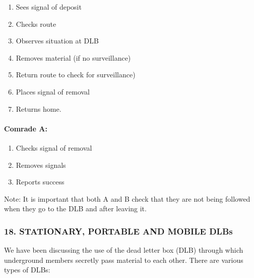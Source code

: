 \begin{enumerate}
\tightlist
\item
  Sees signal of deposit
\item
  Checks route
\item
  Observes situation at DLB
\item
  Removes material (if no surveillance)
\item
  Return route to check for surveillance)
\item
  Places signal of removal
\item
  Returns home.
\end{enumerate}

\paragraph{Comrade A:}

\begin{enumerate}
\tightlist
\item
  Checks signal of removal
\item
  Removes signals
\item
  Reports success
\end{enumerate}

Note: It is important that both A and B check that they are not being
followed when they go to the DLB and after leaving it.

\subsubsection{18. STATIONARY, PORTABLE AND MOBILE DLBs}

We have been discussing the use of the dead letter box (DLB) through
which underground members secretly pass material to each other. There
are various types of DLBs:


